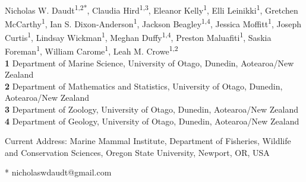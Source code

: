 \documentclass[10pt,letterpaper]{article}
\begin{document}
\vspace*{0.2in}

\begin{flushleft}
{\Large
\textbf{}
}
\newline
\\
Nicholas W. Daudt\textsuperscript{1,2*},
Claudia Hird\textsuperscript{1,3},
Eleanor Kelly\textsuperscript{1},
Elli Leinikki\textsuperscript{1},
Gretchen McCarthy\textsuperscript{1},
Ian S. Dixon-Anderson\textsuperscript{1},
Jackson Beagley\textsuperscript{1,4},
Jessica Moffitt\textsuperscript{1},
Joseph Curtis\textsuperscript{1},
Lindsay Wickman\textsuperscript{1\textcurrency},
Meghan Duffy\textsuperscript{1,4},
Preston Maluafiti\textsuperscript{1},
Saskia Foreman\textsuperscript{1},
William Carome\textsuperscript{1},
Leah M. Crowe\textsuperscript{1,2}
\\
\bigskip
\textbf{1} Department of Marine Science, University of Otago, Dunedin, Aotearoa/New Zealand
\\
\textbf{2} Department of Mathematics and Statistics, University of Otago, Dunedin, Aotearoa/New Zealand
\\
\textbf{3} Department of Zoology, University of Otago, Dunedin, Aotearoa/New Zealand
\\
\textbf{4} Department of Geology, University of Otago, Dunedin, Aotearoa/New Zealand
\\
\bigskip

% 
%


\textcurrency Current Address: Marine Mammal Institute, Department of Fisheries, Wildlife and Conservation Sciences, Oregon State University, Newport, OR, USA 

* nicholaswdaudt@gmail.com 

\end{flushleft}
\end{document}
